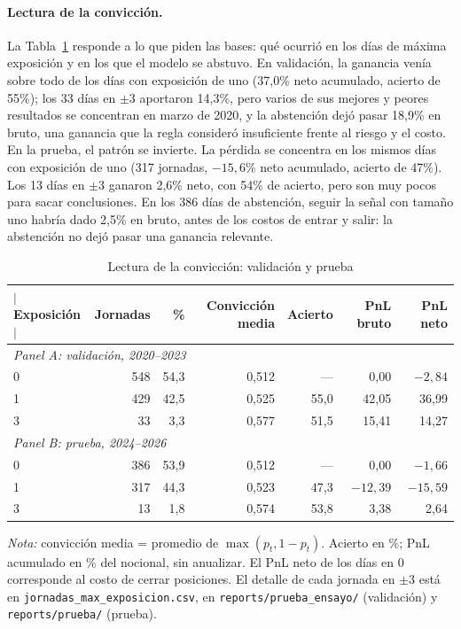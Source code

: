 \documentclass[11pt,a4paper]{article}
\begin{document}
\paragraph{Lectura de la convicción.} La Tabla~\ref{tab:conviccion} responde a lo que piden las bases: qué ocurrió en los días de máxima exposición y en los que el modelo se abstuvo. En validación, la ganancia venía sobre todo de los días con exposición de uno (37,0\% neto acumulado, acierto de 55\%); los 33 días en $\pm3$ aportaron 14,3\%, pero varios de sus mejores y peores resultados se concentran en marzo de 2020, y la abstención dejó pasar 18,9\% en bruto, una ganancia que la regla consideró insuficiente frente al riesgo y el costo. En la prueba, el patrón se invierte. La pérdida se concentra en los mismos días con exposición de uno (317 jornadas, $-15{,}6$\% neto acumulado, acierto de 47\%). Los 13 días en $\pm3$ ganaron 2,6\% neto, con 54\% de acierto, pero son muy pocos para sacar conclusiones. En los 386 días de abstención, seguir la señal con tamaño uno habría dado 2,5\% en bruto, antes de los costos de entrar y salir: la abstención no dejó pasar una ganancia relevante.

\begin{table}[htbp]\centering\small
\caption{Lectura de la convicción: validación y prueba}\label{tab:conviccion}
\begin{threeparttable}
\begin{tabular}{l rrrrrr}
\toprule
$|$Exposición$|$ & Jornadas & \% & Convicción media & Acierto & PnL bruto & PnL neto \\
\midrule
\multicolumn{7}{l}{\emph{Panel A: validación, 2020--2023}} \\
0 & 548 & 54,3 & 0,512 & --- & 0,00 & $-2{,}84$ \\
1 & 429 & 42,5 & 0,525 & 55,0 & 42,05 & 36,99 \\
3 & 33 & 3,3 & 0,577 & 51,5 & 15,41 & 14,27 \\
\midrule
\multicolumn{7}{l}{\emph{Panel B: prueba, 2024--2026}} \\
0 & 386 & 53,9 & 0,512 & --- & 0,00 & $-1{,}66$ \\
1 & 317 & 44,3 & 0,523 & 47,3 & $-12{,}39$ & $-15{,}59$ \\
3 & 13 & 1,8 & 0,574 & 53,8 & 3,38 & 2,64 \\
\bottomrule
\end{tabular}
\begin{tablenotes}\footnotesize
\item \emph{Nota:} convicción media = promedio de \(\max(p_t,1-p_t)\). Acierto en \%; PnL acumulado en \% del nocional, sin anualizar. El PnL neto de los días en 0 corresponde al costo de cerrar posiciones. El detalle de cada jornada en $\pm3$ está en \texttt{jornadas\_max\_exposicion.csv}, en \texttt{reports/prueba\_ensayo/} (validación) y \texttt{reports/prueba/} (prueba).
\end{tablenotes}
\end{threeparttable}
\end{table}
\end{document}

